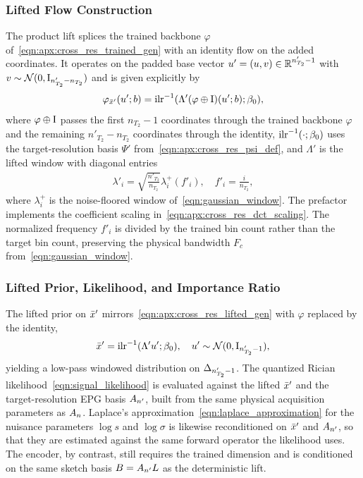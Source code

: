 \subsubsection{Lifted Flow Construction}

The product lift splices the trained backbone $\varphi$ of~\eqref{eqn:apx:cross_res_trained_gen} with an identity flow on the added coordinates.
It operates on the padded base vector $u' = (u, v) \in \mathbb{R}^{n'_{T_2} - 1}$ with $v \sim \mathcal{N}(\mathrm{0}, \mathrm{I}_{n'_{T_2} - n_{T_2}})$ and is given explicitly by
\begin{align}\label{eqn:apx:cross_res_lifted_gen}
    \varphi_{\bar{\distbn}'}(\vv{u}'; \signal) = \InvILR{\Lambda' (\varphi \oplus \Id)(\vv{u}'; \signal); \beta_0},
\end{align}
where $\varphi \oplus \mathrm{I}$ passes the first $n_{T_2} - 1$ coordinates through the trained backbone $\varphi$ and the remaining $n'_{T_2} - n_{T_2}$ coordinates through the identity, $\InvILR{\cdot; \beta_0}$ uses the target-resolution basis $\Psi'$ from~\eqref{eqn:apx:cross_res_psi_def}, and $\Lambda'$ is the lifted window with diagonal entries
\begin{align}\label{eqn:apx:cross_res_lifted_window}
    \lambda'_i = \sqrt{\frac{n'_{T_2}}{n_{T_2}}} \lambda_i^{+}(f'_i), \quad f'_i = \frac{i}{n_{T_2}},
\end{align}
where $\lambda_i^{+}$ is the noise-floored window of~\eqref{eqn:gaussian_window}.
The prefactor implements the coefficient scaling in~\eqref{eqn:apx:cross_res_dct_scaling}.
The normalized frequency $f'_i$ is divided by the trained bin count rather than the target bin count, preserving the physical bandwidth $F_c$ from~\eqref{eqn:gaussian_window}.

\subsubsection{Lifted Prior, Likelihood, and Importance Ratio}

The lifted prior on $\bar{x}'$ mirrors~\eqref{eqn:apx:cross_res_lifted_gen} with $\varphi$ replaced by the identity,
\begin{align}\label{eqn:apx:cross_res_lifted_prior}
    \bar{\distbn}' = \InvILR{\Lambda' \vv{u}'; \beta_0}, \quad \vv{u}' \sim \mathcal{N}(\Zero, \Id_{n'_{T_2} - 1}),
\end{align}
yielding a low-pass windowed distribution on $\Delta_{n'_{T_2} - 1}$.
The quantized Rician likelihood~\eqref{eqn:signal_likelihood} is evaluated against the lifted $\bar{x}'$ and the target-resolution \gls*{EPG} basis $A_{n'}$, built from the same physical acquisition parameters as $A_{n}$.
Laplace's approximation~\eqref{eqn:laplace_approximation} for the nuisance parameters $\log s$ and $\log \sigma$ is likewise reconditioned on $\bar{x}'$ and $A_{n'}$, so that they are estimated against the same forward operator the likelihood uses.
The encoder, by contrast, still requires the trained dimension and is conditioned on the same sketch basis $B = A_{n'} L$ as the deterministic lift.

